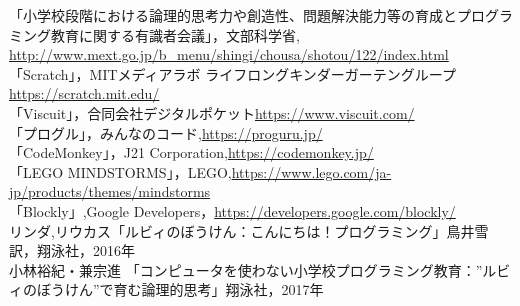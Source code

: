 \newpage


\begin{thebibliography}{5}

 「小学校段階における論理的思考力や創造性、問題解決能力等の育成とプログラミング教育に関する有識者会議」，文部科学省, \url{http://www.mext.go.jp/b_menu/shingi/chousa/shotou/122/index.html}\\

 「Scratch」，MITメディアラボ ライフロングキンダーガーテングループ\url{https://scratch.mit.edu/}\\

 「Viscuit」，合同会社デジタルポケット\url{https://www.viscuit.com/}\\

   「プログル」，みんなのコード,\url{https://proguru.jp/}\\

 「CodeMonkey」，J21 Corporation,\url{https://codemonkey.jp/}\\

 「LEGO MINDSTORMS」，LEGO,\url{https://www.lego.com/ja-jp/products/themes/mindstorms}\\

 「Blockly」,Google Developers，\url{https://developers.google.com/blockly/}\\

 リンダ,リウカス「ルビィのぼうけん：こんにちは！プログラミング」鳥井雪訳，翔泳社，2016年\\

 小林裕紀・兼宗進 「コンピュータを使わない小学校プログラミング教育：”ルビィのぼうけん”で育む論理的思考」翔泳社，2017年\\


\end{thebibliography}
